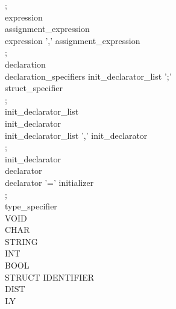 \documentclass[11pt]{article}
\begin{document}
{\hspace*{1cm};\\
expression\\
\hspace*{1cm} assignment\_expression\\
\hspace*{1cm}   expression ',' assignment\_expression\\
\hspace*{1cm};\\
declaration\\
\hspace*{1cm} declaration\_specifiers init\_declarator\_list ';'\\
\hspace*{1cm}	 struct\_specifier\\
\hspace*{1cm};\\
init\_declarator\_list\\
\hspace*{1cm} init\_declarator\\
\hspace*{1cm}   init\_declarator\_list ',' init\_declarator\\
\hspace*{1cm};\\
init\_declarator\\
\hspace*{1cm} declarator\\
\hspace*{1cm}   declarator '=' initializer\\
\hspace*{1cm};\\
type\_specifier\\
\hspace*{1cm} VOID\\
\hspace*{1cm}   CHAR\\
\hspace*{1cm}   STRING\\
\hspace*{1cm}   INT\\
\hspace*{1cm}   BOOL\\
\hspace*{1cm}   STRUCT IDENTIFIER\\
\hspace*{1cm}   DIST\\
\hspace*{1cm}   LY\\
}
\end{document}
